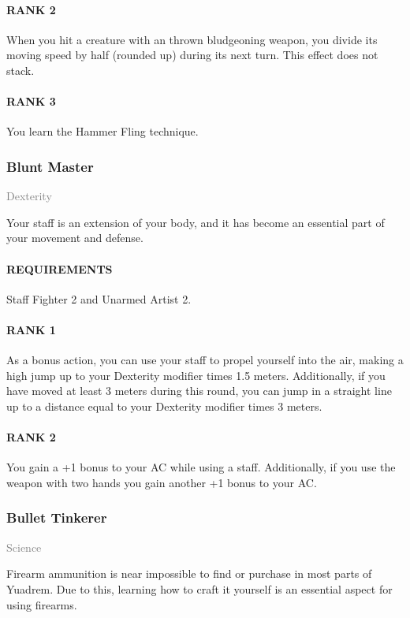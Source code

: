 \paragraph{RANK 2} When you hit a creature with an thrown bludgeoning weapon, you divide its moving speed by half (rounded up) during its next turn.
This effect does not stack.
\paragraph{RANK 3} You learn the Hammer Fling technique.

\subsubsection{Blunt Master} \label{feat::bluntmaster}
\small{\textcolor{gray}{Dexterity}}

\normalsize
Your staff is an extension of your body, and it has become an essential part of your movement and defense.
\paragraph{REQUIREMENTS} Staff Fighter 2 and Unarmed Artist 2.
\paragraph{RANK 1} As a bonus action, you can use your staff to propel yourself into the air, making a high jump up to your Dexterity modifier times 1.5 meters.
Additionally, if you have moved at least 3 meters during this round, you can jump in a straight line up to a distance equal to your Dexterity modifier times 3 meters.
\paragraph{RANK 2} You gain a +1 bonus to your AC while using a staff.
Additionally, if you use the weapon with two hands you gain another +1 bonus to your AC.

\subsubsection{Bullet Tinkerer} \label{feat::bullettinkerer}
\small{\textcolor{gray}{Science}}

\normalsize
Firearm ammunition is near impossible to find or purchase in most parts of Yuadrem.
Due to this, learning how to craft it yourself is an essential aspect for using firearms.
